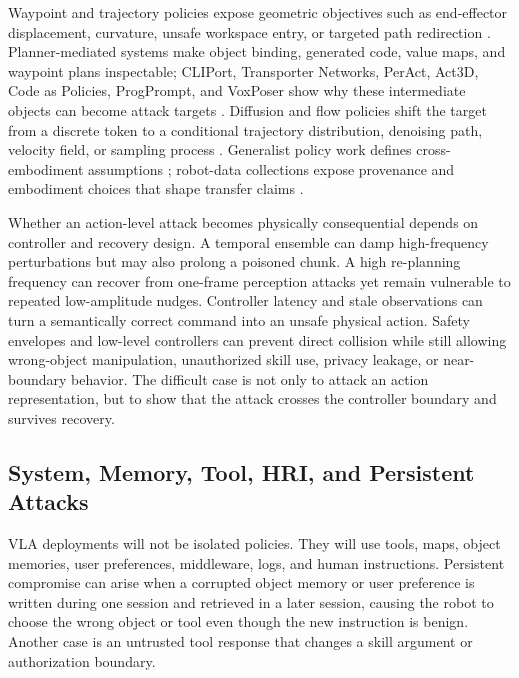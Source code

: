 Waypoint and trajectory policies expose geometric objectives such as end-effector displacement, curvature, unsafe workspace entry, or targeted path redirection \cite{wang2025vlaadversarial,puthumanaillam2026trajectory}. Planner-mediated systems make object binding, generated code, value maps, and waypoint plans inspectable; CLIPort, Transporter Networks, PerAct, Act3D, Code as Policies, ProgPrompt, and VoxPoser show why these intermediate objects can become attack targets \cite{shridhar2022cliport,zeng2020transporter,shridhar2022peract,gervet2023act3d} \cite{liang2023code,singh2023progprompt,huang2023voxposer,goyal2023rvt}. Diffusion and flow policies shift the target from a discrete token to a conditional trajectory distribution, denoising path, velocity field, or sampling process \cite{chi2023diffusion,black2024pi0,ze2024dp3,xian2024diffuseractor,liu2024rdt} \cite{reuss2024mdt,lu2026h3dp}. Generalist policy work defines cross-embodiment assumptions \cite{ghosh2024octo,openx2023,reed2022gato,bousmalis2023robocat,nvidia2025gr00tn1}; robot-data collections expose provenance and embodiment choices that shape transfer claims \cite{khazatsky2024droid,walke2023bridgedata,dasari2019robonet,mandlekar2021robomimic,mandlekar2023mimicgen}.

Whether an action-level attack becomes physically consequential depends on controller and recovery design. A temporal ensemble can damp high-frequency perturbations but may also prolong a poisoned chunk. A high re-planning frequency can recover from one-frame perception attacks yet remain vulnerable to repeated low-amplitude nudges. Controller latency and stale observations can turn a semantically correct command into an unsafe physical action. Safety envelopes and low-level controllers can prevent direct collision while still allowing wrong-object manipulation, unauthorized skill use, privacy leakage, or near-boundary behavior. The difficult case is not only to attack an action representation, but to show that the attack crosses the controller boundary and survives recovery.

\subsection{System, Memory, Tool, HRI, and Persistent Attacks}

VLA deployments will not be isolated policies. They will use tools, maps, object memories, user preferences, middleware, logs, and human instructions. Persistent compromise can arise when a corrupted object memory or user preference is written during one session and retrieved in a later session, causing the robot to choose the wrong object or tool even though the new instruction is benign. Another case is an untrusted tool response that changes a skill argument or authorization boundary.

